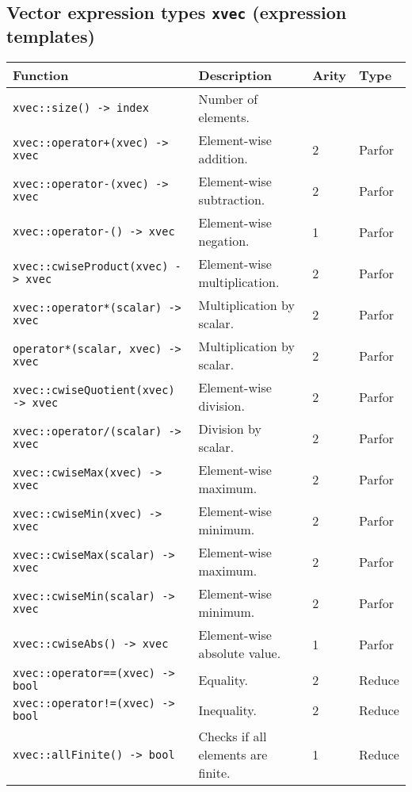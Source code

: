 \documentclass{article}
\begin{document}
\subsection*{Vector expression types \texttt{xvec} (expression templates)}
\begin{tabular}{|p{7.2cm}|p{5.8cm}|p{0.95cm}|p{1.15cm}|}
\hline
\textbf{Function} & \textbf{Description} & \textbf{Arity} & \textbf{Type}\\\hline
\lstinline|xvec::size() -> index| & Number of elements. & & \\\hline
\lstinline|xvec::operator+(xvec) -> xvec| & Element-wise addition. & 2 & Parfor \\\hline
\lstinline|xvec::operator-(xvec) -> xvec| & Element-wise subtraction. & 2 & Parfor \\\hline
\lstinline|xvec::operator-() -> xvec| & Element-wise negation. & 1 & Parfor \\\hline
\lstinline|xvec::cwiseProduct(xvec) -> xvec| & Element-wise multiplication. & 2 & Parfor \\\hline
\lstinline|xvec::operator*(scalar) -> xvec| & Multiplication by scalar. & 2 & Parfor \\\hline
\lstinline|operator*(scalar, xvec) -> xvec| & Multiplication by scalar. & 2 & Parfor \\\hline
\lstinline|xvec::cwiseQuotient(xvec) -> xvec| & Element-wise division. & 2 & Parfor \\\hline
\lstinline|xvec::operator/(scalar) -> xvec| & Division by scalar. & 2 & Parfor \\\hline
\lstinline|xvec::cwiseMax(xvec) -> xvec| & Element-wise maximum. & 2 & Parfor \\\hline
\lstinline|xvec::cwiseMin(xvec) -> xvec| & Element-wise minimum. & 2 & Parfor \\\hline
\lstinline|xvec::cwiseMax(scalar) -> xvec| & Element-wise maximum. & 2 & Parfor \\\hline
\lstinline|xvec::cwiseMin(scalar) -> xvec| & Element-wise minimum. & 2 & Parfor \\\hline
\lstinline|xvec::cwiseAbs() -> xvec| & Element-wise absolute value. & 1 & Parfor \\\hline
\lstinline|xvec::operator==(xvec) -> bool| & Equality. & 2 & Reduce \\\hline
\lstinline|xvec::operator!=(xvec) -> bool| & Inequality. & 2 & Reduce \\\hline
\lstinline|xvec::allFinite() -> bool| & Checks if all elements are finite. & 1 & Reduce \\\hline

\end{tabular}
\end{document}

